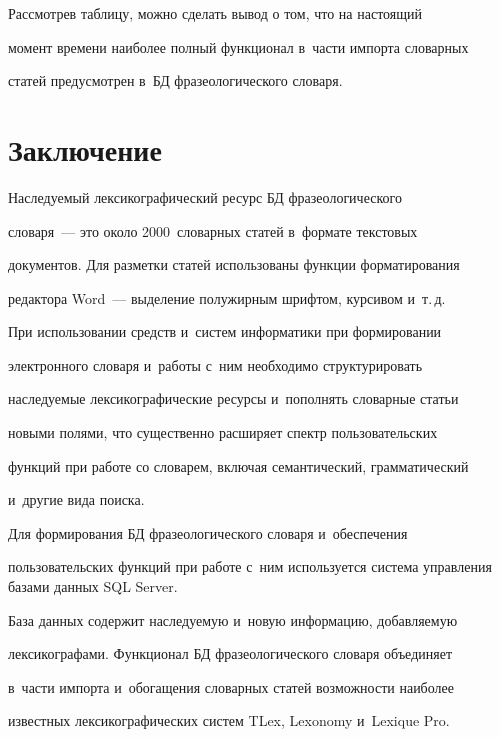    

   Рассмотрев таблицу, можно сделать вывод о том, что на настоящий 

момент времени наиболее полный функционал в~части импорта словарных 

статей предусмотрен в~БД фразеологического словаря.

   

\section{Заключение}



   Наследуемый лексикографический ресурс БД фразеологического 

словаря~--- это около 2000~словарных статей в~формате текстовых 

документов. Для разметки статей использованы функции форматирования 

редактора Word~--- выделение полужирным шрифтом, курсивом и~т.\,д.

     

     При использовании средств и~систем информатики при формировании 

электронного словаря и~работы с~ним необходимо структурировать 

наследуемые лексикографические ресурсы и~пополнять словарные статьи 

новыми полями, что существенно расширяет спектр пользовательских 

функций при работе со словарем, включая семантический, грамматический 

и~другие вида поиска.

     

     Для формирования БД фразеологического словаря и~обеспечения 

пользовательских функций при работе с~ним используется сис\-те\-ма управ\-ле\-ния базами данных SQL Server. 

База данных содержит наследуемую и~новую информацию, добавляемую 

лексикографами. Функционал БД фразеологического словаря объединяет 

в~части импорта и~обогащения словарных статей возможности наиболее 

известных лексикографических систем TLex, Lexonomy и~Lexique Pro.



